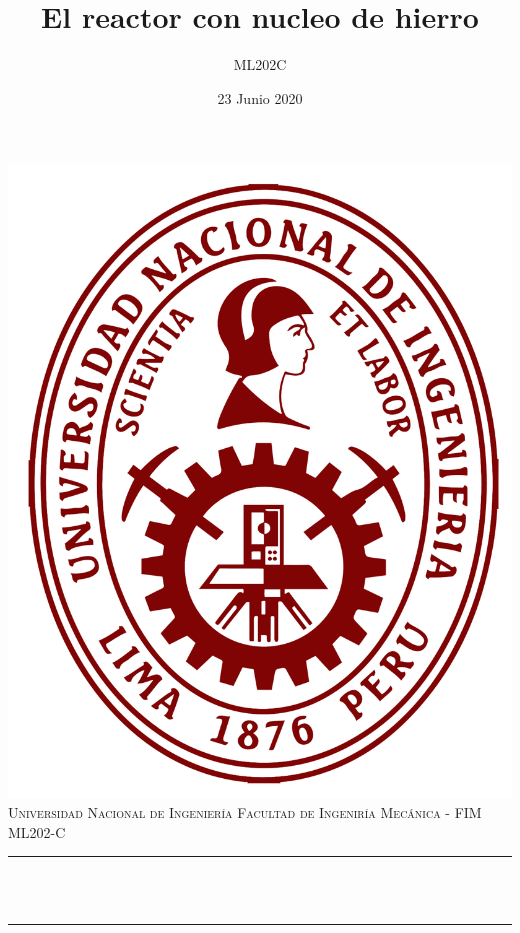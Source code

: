 \documentclass[12pt]{article}
\title{El reactor con nucleo de hierro}				%
\author{ML202C}								%
\date{23 Junio 2020}							%
\makeatletter
\let\thetitle\@title
\makeatother
\begin{document}

\begin{titlepage}
	\centering
    \vspace*{0.0 cm}
    \includegraphics[scale = 0.09]{uni_logo.png}\\[1.0 cm]	%
    \textsc{\LARGE Universidad Nacional de Ingeniería \newline\newline Facultad de Ingeniría Mecánica - FIM}\\[1.2 cm]	%
	\textsc{\Large ML202-C}\\[0.5 cm]				%
	\rule{\linewidth}{0.2 mm} \\[0.4 cm]
	{ \huge \bfseries \thetitle}\\
	\rule{\linewidth}{0.2 mm} \\[0.5 cm]
	

\end{titlepage}
\end{document}
